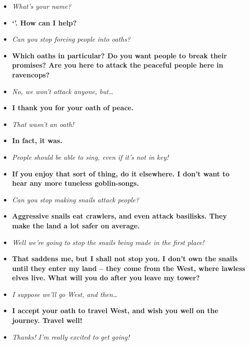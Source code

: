 \begin{multicols}{2}
\begin{itemize}
  \item\it
  What's your name?
  \item[\adforn{54}]\bf
  `'.
  How can I help?
  \item\it
  Can you stop forcing people into oaths?
  \item[\adforn{54}]\bf
  Which oaths in particular?
  Do you want people to break their promises?
  Are you here to attack the peaceful people here in \gls{ravencops}?
  \item\it
  No, we won't attack anyone, but\ldots
  \item[\adforn{54}]\bf
  I thank you for your oath of peace.
  \item\it
  That wasn't an oath!
  \item[\adforn{54}]\bf
  In fact, it was.
  \item\it
  People should be able to sing, even if it's not in key!
  \item[\adforn{54}]\bf
  If you enjoy that sort of thing, do it elsewhere.
  I don't want to hear any more tuneless goblin-songs.
  \item\it
  Can you stop making snails attack people?
  \item[\adforn{54}]\bf
  Aggressive snails eat \glspl{crawler}, and even attack \glspl{basilisk}.
  They make the land a lot safer on average.
  \item\it
  Well we're going to stop the snails being made in the first place!
  \item[\adforn{54}]\bf
  That saddens me, but I shall not stop you.
  I don't own the snails until they enter my land -- they come from the West, where lawless elves live.
  What will you do after you leave my tower?
  \item\it
  I suppose we'll go West, and then\ldots
  \item[\adforn{54}]\bf
  I accept your oath to travel West, and wish you well on the journey.
  Travel well!
  \item\it
  Thanks!
  I'm really excited to get going!
\end{itemize}

\MindElder

\showStdSpells[
  
  
  
  
]

\label{oathlessLovers}


\end{multicols}
